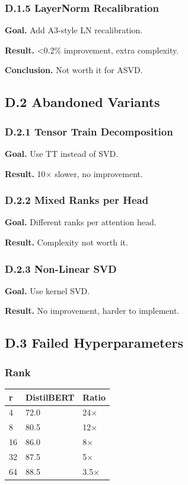 \subsubsection{D.1.5 LayerNorm Recalibration}

\textbf{Goal.} Add A3-style LN recalibration.

\textbf{Result.} \textless{}0.2\% improvement, extra complexity.

\textbf{Conclusion.} Not worth it for ASVD.

\subsection{D.2 Abandoned Variants}

\subsubsection{D.2.1 Tensor Train Decomposition}

\textbf{Goal.} Use TT instead of SVD.

\textbf{Result.} 10$\times$ slower, no improvement.

\subsubsection{D.2.2 Mixed Ranks per Head}

\textbf{Goal.} Different ranks per attention head.

\textbf{Result.} Complexity not worth it.

\subsubsection{D.2.3 Non-Linear SVD}

\textbf{Goal.} Use kernel SVD.

\textbf{Result.} No improvement, harder to implement.

\subsection{D.3 Failed Hyperparameters}

\subsubsection{Rank}

\begin{table}[H]
\centering
\small
\begin{tabular}{lll}
\toprule
\textbf{r} & \textbf{DistilBERT} & \textbf{Ratio} \\
\midrule
4 & 72.0 & 24$\times$ \\
8 & 80.5 & 12$\times$ \\
16 & 86.0 & 8$\times$ \\
32 & 87.5 & 5$\times$ \\
64 & 88.5 & 3.5$\times$ \\
\bottomrule
\end{tabular}
\end{table}

